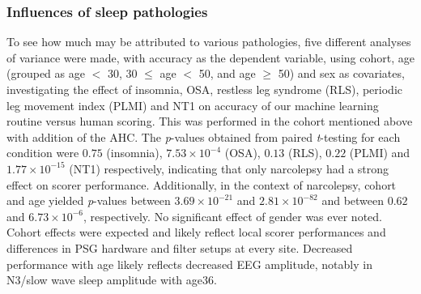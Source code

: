 
\subsubsection{Influences of sleep pathologies}
To see how much may be attributed to various pathologies, five different analyses of variance were made, with accuracy as the dependent variable, using cohort, age (grouped as age $<$ 30, 30 $\leq$ age $<$ 50, and age $\geq$ 50) and sex as covariates, investigating the effect of insomnia, OSA, restless leg syndrome (RLS), periodic leg movement index (PLMI) and \ac{NT1} on accuracy of our machine learning routine versus human scoring. 
This was performed in the cohort mentioned above with addition of the \ac{AHC}. 
The \textit{p}-values obtained from paired \textit{t}-testing for each condition were $0.75$ (insomnia), $7.53 \times 10^{-4}$ (OSA), $0.13$ (RLS), $0.22$ (PLMI) and $1.77 \times 10^{-15}$ (\ac{NT1}) respectively, indicating that only narcolepsy had a strong effect on scorer performance. 
Additionally, in the context of narcolepsy, cohort and age yielded \textit{p}-values between $3.69 \times 10^{-21}$ and $2.81 \times 10^{-82}$ and between $0.62$ and $6.73 \times 10^{-6}$, respectively. 
No significant effect of gender was ever noted. 
Cohort effects were expected and likely reflect local scorer performances and differences in \ac{PSG} hardware and filter setups at every site. 
Decreased performance with age likely reflects decreased \ac{EEG} amplitude, notably in \ac{N3}/slow wave sleep amplitude with age36.

